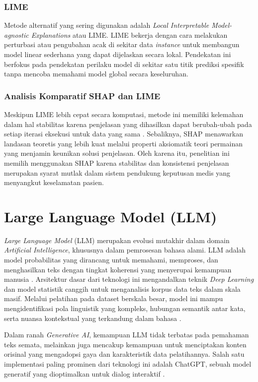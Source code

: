 \subsubsection{LIME}
Metode alternatif yang sering digunakan adalah \textit{Local Interpretable Model-agnostic Explanations} atau LIME. LIME bekerja dengan cara melakukan perturbasi atau pengubahan acak di sekitar data \textit{instance} untuk membangun model linear sederhana yang dapat dijelaskan secara lokal. Pendekatan ini berfokus pada pendekatan perilaku model di sekitar satu titik prediksi spesifik tanpa mencoba memahami model global secara keseluruhan.

\subsubsection{Analisis Komparatif SHAP dan LIME}
Meskipun LIME lebih cepat secara komputasi, metode ini memiliki kelemahan dalam hal stabilitas karena penjelasan yang dihasilkan dapat berubah-ubah pada setiap iterasi eksekusi untuk data yang sama \parencite{Molnar2020Interpretable}. Sebaliknya, SHAP menawarkan landasan teoretis yang lebih kuat melalui properti aksiomatik teori permainan yang menjamin keunikan solusi penjelasan. Oleh karena itu, penelitian ini memilih menggunakan SHAP karena stabilitas dan konsistensi penjelasan merupakan syarat mutlak dalam sistem pendukung keputusan medis yang menyangkut keselamatan pasien.

\section{Large Language Model (LLM)}
\textit{Large Language Model} (LLM) merupakan evolusi mutakhir dalam domain \textit{Artificial Intelligence}, khususnya dalam pemrosesan bahasa alami. LLM adalah model probabilitas yang dirancang untuk memahami, memproses, dan menghasilkan teks dengan tingkat koherensi yang menyerupai kemampuan manusia \parencite{Zhao2023Survey}. Arsitektur dasar dari teknologi ini mengandalkan teknik \textit{Deep Learning} dan model statistik canggih untuk menganalisis korpus data teks dalam skala masif. Melalui pelatihan pada dataset berskala besar, model ini mampu mengidentifikasi pola linguistik yang kompleks, hubungan semantik antar kata, serta nuansa kontekstual yang terkandung dalam bahasa \parencite{Kasneci2023ChatGPT}.

Dalam ranah \textit{Generative AI}, kemampuan LLM tidak terbatas pada pemahaman teks semata, melainkan juga mencakup kemampuan untuk menciptakan konten orisinal yang mengadopsi gaya dan karakteristik data pelatihannya. Salah satu implementasi paling prominen dari teknologi ini adalah ChatGPT, sebuah model generatif yang dioptimalkan untuk dialog interaktif \parencite{OpenAI2023GPT4}.

